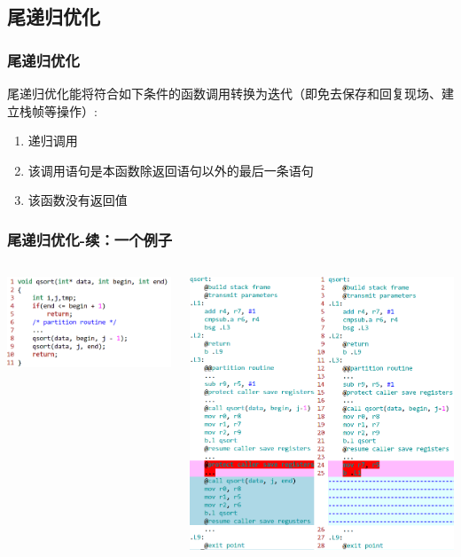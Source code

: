 \documentclass{beamer}
\begin{document}
\subsection{尾递归优化}
\begin{frame}
	\frametitle{尾递归优化}
	尾递归优化能将符合如下条件的函数调用转换为迭代（即\alert{免去保存和回复现场、建立栈帧等操作}）:
	\begin{enumerate}
		\item 递归调用
		\item 该调用语句是本函数除返回语句以外的最后一条语句
		\item 该函数没有返回值
	\end{enumerate}
\end{frame}
\begin{frame}
	\frametitle{尾递归优化-续：一个例子}
	\begin{columns}
		\begin{flushleft}
		\includegraphics[scale=0.3]{tail_recursion_example.png}
		\end{flushleft}
		\begin{center}
		\includegraphics[scale=0.2]{tail_recursion.png}
		\end{center}
	\end{columns}
\end{frame}
\end{document}
